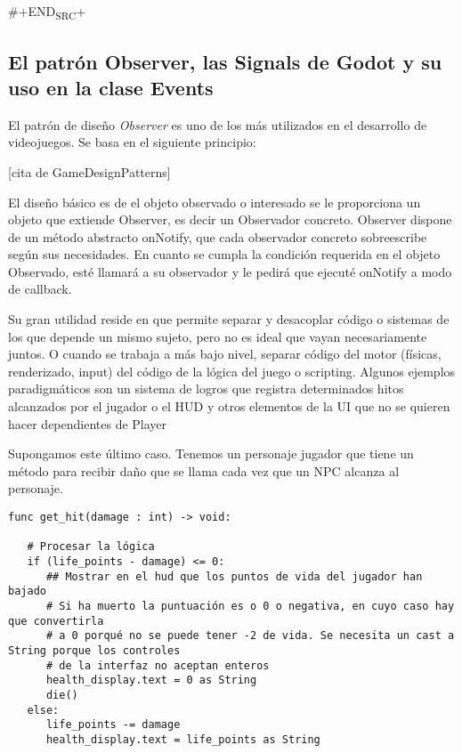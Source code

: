 \documentclass[11pt]{article}
\begin{document}
\#+END\textsubscript{SRC}+





\subsection{El patrón Observer, las Signals de Godot y su uso en la clase Events}
\label{sec:org6f02604}

El patrón de diseño \emph{Observer} es uno de los más utilizados en el desarrollo de videojuegos. Se basa en el siguiente principio:

[cita de GameDesignPatterns]

El diseño básico es de el objeto observado o interesado se le proporciona un objeto que extiende Observer, es decir un Observador concreto. Observer dispone de un método abstracto onNotify, que cada observador concreto sobreescribe según sus necesidades. En cuanto se cumpla la condición requerida en el objeto Observado, esté llamará a su observador y le pedirá que ejecuté onNotify a modo de callback.

Su gran utilidad reside en que permite separar y desacoplar código o sistemas de los que depende un mismo sujeto, pero no es ideal que vayan necesariamente juntos. O cuando se trabaja a más bajo nivel, separar código del motor (físicas, renderizado, input) del código de la lógica del juego o scripting. Algunos ejemplos paradigmáticos son un sistema de logros que registra determinados hitos alcanzados por el jugador o el HUD y otros elementos de la UI que no se quieren hacer dependientes de Player

Supongamos este último caso. Tenemos un personaje jugador que tiene un método para recibir daño que se llama cada vez que un NPC alcanza al personaje.

\begin{verbatim}
func get_hit(damage : int) -> void:

   # Procesar la lógica
   if (life_points - damage) <= 0:
      ## Mostrar en el hud que los puntos de vida del jugador han bajado
      # Si ha muerto la puntuación es o 0 o negativa, en cuyo caso hay que convertirla
      # a 0 porqué no se puede tener -2 de vida. Se necesita un cast a String porque los controles
      # de la interfaz no aceptan enteros
      health_display.text = 0 as String
      die()
   else:
      life_points -= damage
      health_display.text = life_points as String
\end{verbatim}
\end{document}
